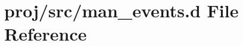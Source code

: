 \hypertarget{man__events_8d}{}\section{proj/src/man\+\_\+events.d File Reference}
\label{man__events_8d}
